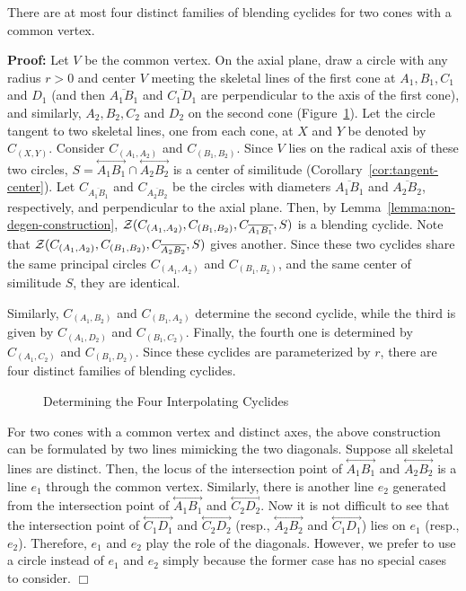 \begin{lemma}
\label{lemma:upper-bound}
     There are at most four distinct families of blending cyclides for
two cones with a common vertex.
\end{lemma}
{\bf Proof:}  Let $V$ be the common vertex.  On the axial plane, draw a 
circle with any radius $r>0$ and center $V$ meeting the skeletal lines of the 
first cone at $A_1, B_1, C_1$ and $D_1$ (and then $\overline{A_1B_1}$ and 
$\overline{C_1D_1}$ are perpendicular to the axis of the first cone), and 
similarly, $A_2, B_2, C_2$ and $D_2$ on the second cone
(Figure~\ref{fig:upper-bound}).  Let the circle tangent to two skeletal lines,
one from each cone, at $X$ and $Y$ be denoted by $C_{(X,Y)}$.  
Consider $C_{(A_1,A_2)}$ and $C_{(B_1,B_2)}$.  Since $V$ lies on the radical 
axis of these two circles,
$S=\stackrel{\longleftrightarrow}{A_1B_1}\cap
\stackrel{\longleftrightarrow}{A_2B_2}$ is a center of similitude
(Corollary~\ref{cor:tangent-center}).  Let $C_{\overline{A_1B_1}}$ and
$C_{\overline{A_2B_2}}$ be the circles with diameters $\overline{A_1B_1}$ and
$\overline{A_2B_2}$, respectively, and perpendicular to the axial plane.
Then, by Lemma~\ref{lemma:non-degen-construction},
${\cal Z}(C_{(A_1,A_2)},C_{(B_1,B_2)},C_{\overline{A_1B_1}},S)$ is a blending
cyclide.  Note that
${\cal Z}(C_{(A_1,A_2)},C_{(B_1,B_2)},C_{\overline{A_2B_2}},S)$ gives another.
Since these two cyclides share the same principal circles
$C_{(A_1,A_2)}$ and $C_{(B_1,B_2)}$, and the same center of similitude $S$,
they are identical.

     Similarly, $C_{(A_1,B_2)}$ and $C_{(B_1,A_2)}$ determine the second 
cyclide, while the third is given by $C_{(A_1,D_2)}$ and $C_{(B_1,C_2)}$.  
Finally, the fourth one is determined by $C_{(A_1,C_2)}$ and $C_{(B_1,D_2)}$.
Since these cyclides are parameterized by $r$, there are four distinct 
families of blending cyclides. \QED
\begin{figure}
\vspace{4cm}
\caption{Determining the Four Interpolating Cyclides}
\label{fig:upper-bound}
\end{figure}

\begin{remark} \rm
     For two cones with a common vertex and distinct axes, the above 
construction can be
formulated by two lines mimicking the two diagonals.  Suppose all skeletal 
lines are distinct.  Then, the locus of the intersection point of
$\stackrel{\longleftrightarrow}{A_1B_1}$ and
$\stackrel{\longleftrightarrow}{A_2B_2}$ is a line $e_1$ through the common 
vertex.  Similarly, there is another line $e_2$ generated from the intersection
point of $\stackrel{\longleftrightarrow}{A_1B_1}$ and
$\stackrel{\longleftrightarrow}{C_2D_2}$.  Now it is not difficult to see that
the intersection point of $\stackrel{\longleftrightarrow}{C_1D_1}$ and
$\stackrel{\longleftrightarrow}{C_2D_2}$ (resp.,
$\stackrel{\longleftrightarrow}{A_2B_2}$ and
$\stackrel{\longleftrightarrow}{C_1D_1}$) lies on $e_1$ (resp., $e_2$).
Therefore, $e_1$ and $e_2$ play the role of the diagonals.  However,
we prefer to use a circle instead of $e_1$ and $e_2$ simply because
the former case has no special cases to consider.  $\Box$
\end{remark}

